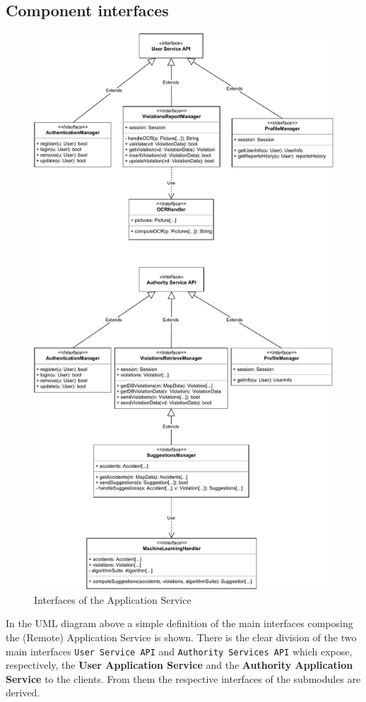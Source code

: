 \documentclass[12pt,a4paper]{article}
\begin{document}
\subsection{Component interfaces}
\begin{figure}[H]
		\centering
		\includegraphics[width=0.7\linewidth]{../assets/images/component_interfaces.pdf}
		\caption{Interfaces of the Application Service}
	\end{figure}
\newpage
In the UML diagram above a simple definition of the main interfaces composing the (Remote) Application Service is shown. 
There is the clear division of the two main interfaces \texttt{User Service API} and \texttt{Authority Services API} which expose, respectively, the \textbf{User Application Service} and the \textbf{Authority Application Service} to the clients. From them the respective interfaces of the submodules are derived.
\end{document}
